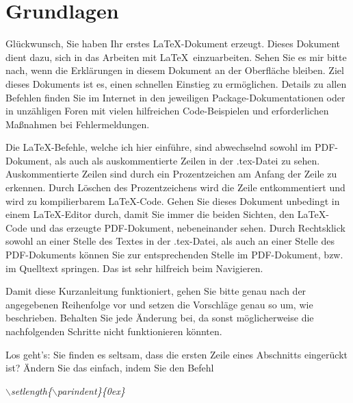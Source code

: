 \documentclass[ngerman,parskip]{scrbook}
\begin{document}
\tableofcontents

\chapter{Grundlagen}

Glückwunsch, Sie haben Ihr erstes \LaTeX-Dokument erzeugt. Dieses Dokument
dient dazu, sich in das Arbeiten mit \LaTeX~einzuarbeiten. Sehen Sie es mir
bitte nach, wenn die Erklärungen in diesem Dokument an der Oberfläche bleiben.
Ziel dieses Dokuments ist es, einen schnellen Einstieg zu ermöglichen. Details
zu allen Befehlen finden Sie im Internet in den jeweiligen
Package-Dokumentationen oder in unzähligen Foren mit vielen hilfreichen
Code-Beispielen und erforderlichen Maßnahmen bei Fehlermeldungen.

Die \LaTeX-Befehle, welche ich hier einführe, sind abwechselnd sowohl im
PDF-Dokument, als auch als auskommentierte Zeilen in der .tex-Datei zu sehen.
Auskommentierte Zeilen sind durch ein Prozentzeichen am Anfang der Zeile zu
erkennen. Durch Löschen des Prozentzeichens wird die Zeile entkommentiert und
wird zu kompilierbarem \LaTeX-Code. Gehen Sie dieses Dokument unbedingt in
einem \LaTeX-Editor durch, damit Sie immer die beiden Sichten, den \LaTeX-Code
und das erzeugte PDF-Dokument, nebeneinander sehen. Durch Rechtsklick sowohl an
einer Stelle des Textes in der .tex-Datei, als auch an einer Stelle des
PDF-Dokuments können Sie zur entsprechenden Stelle im PDF-Dokument, bzw. im
Quelltext springen. Das ist sehr hilfreich beim Navigieren.

Damit diese Kurzanleitung funktioniert, gehen Sie bitte genau nach der
angegebenen Reihenfolge vor und setzen die Vorschläge genau so um, wie
beschrieben. Behalten Sie jede Änderung bei, da sonst möglicherweise die
nachfolgenden Schritte nicht funktionieren könnten.

Los geht's: Sie finden es seltsam, dass die ersten Zeile eines Abschnitts
eingerückt ist? Ändern Sie das einfach, indem Sie den Befehl

\textit{$\backslash$setlength\{$\backslash$parindent\}\{0ex\}}
\end{document}
